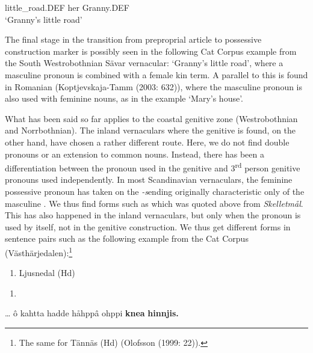 little\_road.DEF  her  Granny.DEF\\ %


‘Granny’s little road’
\z


 The final stage in the transition from preproprial article to possessive construction marker is possibly seen in the following Cat Corpus example from the South Westrobothnian Sävar vernacular: ‘Granny’s little road’, where a masculine pronoun is combined with a female kin term. A parallel to this is found in Romanian (Koptjevskaja-Tamm (2003: 632)), where the masculine pronoun  is also used with feminine nouns, as in the example  ‘Mary’s house’.

What has been said so far applies to the coastal genitive zone (Westrobothnian and Norrbothnian). The inland vernaculars where the genitive is found, on the other hand, have chosen a rather different route. Here, we do not find double pronouns or an extension to common nouns. Instead, there has been a differentiation between the pronoun used in the genitive and 3\textsuperscript{rd} person genitive pronouns used independently. In most Scandinavian vernaculars, the feminine possessive pronoun has taken on the\textit{ {}-s}\textstyleLinguisticExample{ }ending originally characteristic only of the masculine . We thus find forms such as  which was quoted above from \textit{Skelletmål}. This has also happened in the inland vernaculars, but only when the pronoun is used by itself, not in the genitive construction. We thus get different forms in sentence pairs such as the following example from the Cat Corpus (Västhärjedalen):\footnote{ The same for Tännäs (Hd) (Olofsson (1999: 22)).}

\begin{enumerate} %
\item 
Ljusnedal (Hd)

\end{enumerate} %
\setcounter{listLFOxcviiileveli}{0}
\begin{enumerate} %
\item 
\end{enumerate} %
\ea\label{}
\gll …  ô  kahtta  hadde  håhppâ  ohppi  \textbf{knea} \textbf{hinnjis.} \\



